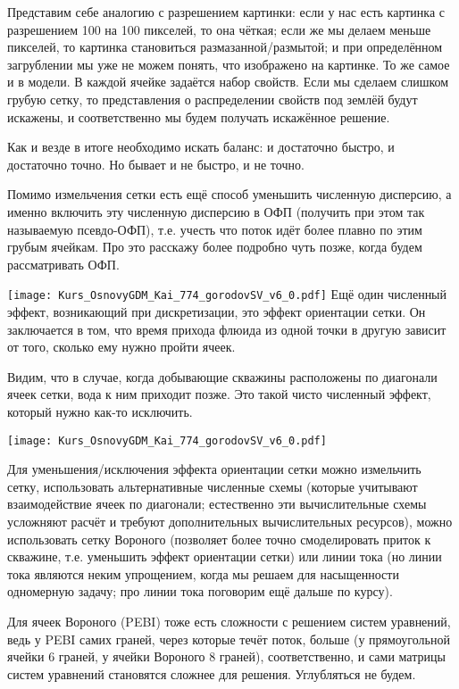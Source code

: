 \documentclass[main.tex]{subfiles}
\begin{document}
Представим себе аналогию с разрешением картинки: если у нас есть картинка с разрешением 100 на 100 пикселей, то она чёткая; если же мы делаем меньше пикселей, то картинка становиться размазанной/размытой; и при определённом загрублении мы уже не можем понять, что изображено на картинке.
То же самое и в модели.
В каждой ячейке задаётся набор свойств.
Если мы сделаем слишком грубую сетку, то представления о распределении свойств под землёй будут искажены, и соответственно мы будем получать искажённое решение.

Как и везде в итоге необходимо искать баланс: и достаточно быстро, и достаточно точно.
Но бывает и не быстро, и не точно.

Помимо измельчения сетки есть ещё способ уменьшить численную дисперсию, а именно включить эту численную дисперсию в ОФП (получить при этом так называемую псевдо-ОФП), т.е. учесть что поток идёт более плавно по этим грубым ячейкам.
Про это расскажу более подробно чуть позже, когда будем рассматривать ОФП.

\texttt{[image: Kurs\_OsnovyGDM\_Kai\_774\_gorodovSV\_v6\_0.pdf]}
Ещё один численный эффект, возникающий при дискретизации, это эффект ориентации сетки.
Он заключается в том, что время прихода флюида из одной точки в другую зависит от того, сколько ему нужно пройти ячеек.

Видим, что в случае, когда добывающие скважины расположены по диагонали ячеек сетки, вода к ним приходит позже.
Это такой чисто численный эффект, который нужно как-то исключить. 

\texttt{[image: Kurs\_OsnovyGDM\_Kai\_774\_gorodovSV\_v6\_0.pdf]}

Для уменьшения/исключения эффекта ориентации сетки можно измельчить сетку, использовать альтернативные численные схемы (которые учитывают взаимодействие ячеек по диагонали; естественно эти вычислительные схемы усложняют расчёт и требуют дополнительных вычислительных ресурсов), можно использовать сетку Вороного (позволяет более точно смоделировать приток к скважине, т.е. уменьшить эффект ориентации сетки) или линии тока (но линии тока являются неким упрощением, когда мы решаем для насыщенности одномерную задачу; про линии тока поговорим ещё дальше по курсу).

Для ячеек Вороного (PEBI) тоже есть сложности с решением систем уравнений, ведь у PEBI самих граней, через которые течёт поток, больше (у прямоугольной ячейки 6 граней, у ячейки Вороного 8 граней), соответственно, и сами матрицы систем уравнений становятся сложнее для решения.
Углубляться не будем.
\end{document}

